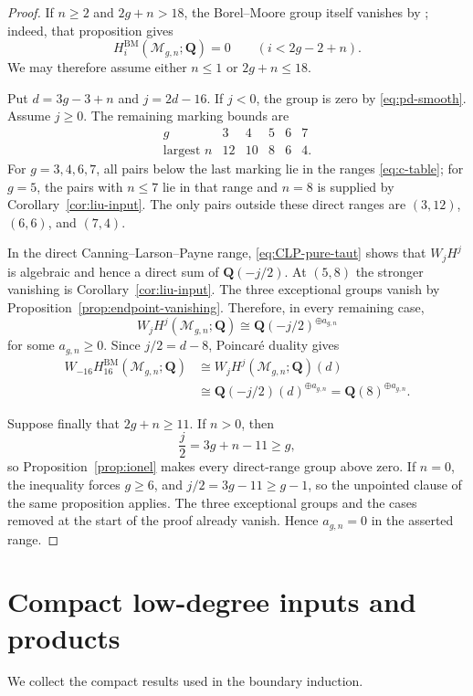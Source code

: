 \documentclass[12pt,reqno]{amsart}
\newcommand{\Q}{\mathbf{Q}}
\newcommand{\M}{\mathcal{M}}
\newcommand{\BM}{\mathrm{BM}}
\theoremstyle{definition}
\theoremstyle{remark}
\begin{document}
\begin{proof}
If $n\geq2$ and $2g+n>18$, the Borel--Moore group itself vanishes by
\cite[Proposition~2.1]{BFP}; indeed, that proposition gives
\[
 H_i^{\BM}(\M_{g,n};\Q)=0\qquad(i<2g-2+n).
\]
We may therefore assume either $n\leq1$ or $2g+n\leq18$.

Put $d=3g-3+n$ and $j=2d-16$.  If $j<0$, the group is zero by
\eqref{eq:pd-smooth}.  Assume $j\geq0$.  The remaining marking bounds are
\[
\begin{array}{c|ccccc}
g&3&4&5&6&7\\ \hline
\text{largest }n&12&10&8&6&4.
\end{array}
\]
For $g=3,4,6,7$, all pairs below the last marking lie in the ranges
\eqref{eq:c-table}; for $g=5$, the pairs with $n\leq7$ lie in that range and
$n=8$ is supplied by Corollary~\ref{cor:liu-input}.  The only pairs outside
these direct ranges are
$(3,12)$, $(6,6)$, and $(7,4)$.

In the direct Canning--Larson--Payne range,
\eqref{eq:CLP-pure-taut} shows that $W_jH^j$ is algebraic and hence a direct
sum of $\Q(-j/2)$.  At $(5,8)$ the stronger vanishing is
Corollary~\ref{cor:liu-input}.  The three exceptional groups vanish by
Proposition~\ref{prop:endpoint-vanishing}.  Therefore, in every remaining
case,
\[
 W_jH^j(\M_{g,n};\Q)
 \cong\Q(-j/2)^{\oplus a_{g,n}}
\]
for some $a_{g,n}\geq0$.  Since $j/2=d-8$, Poincar\'e duality gives
\begin{align*}
 W_{-16}H_{16}^{\BM}(\M_{g,n};\Q)
 &\cong W_jH^j(\M_{g,n};\Q)(d)\\
 &\cong\Q(-j/2)(d)^{\oplus a_{g,n}}
  =\Q(8)^{\oplus a_{g,n}}.
\end{align*}

Suppose finally that $2g+n\geq11$.  If $n>0$, then
\[
 \frac j2=3g+n-11\geq g,
\]
so Proposition~\ref{prop:ionel} makes every direct-range group above zero.
If $n=0$, the inequality forces $g\geq6$, and
$j/2=3g-11\geq g-1$, so the unpointed clause of the same proposition
applies.  The three exceptional groups and the cases removed at the start
of the proof already vanish.  Hence $a_{g,n}=0$ in the asserted range.
\end{proof}

\section{Compact low-degree inputs and products}
\label{sec:compact-inputs}

We collect the compact results used in the boundary induction.
\end{document}
